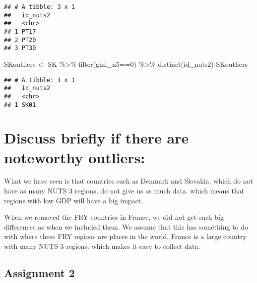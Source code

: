 \documentclass[
]{article}
\newenvironment{Shaded}{\begin{snugshade}}{\end{snugshade}}
\newcommand{\DecValTok}[1]{\textcolor[rgb]{0.00,0.00,0.81}{#1}}
\newcommand{\FunctionTok}[1]{\textcolor[rgb]{0.00,0.00,0.00}{#1}}
\newcommand{\NormalTok}[1]{#1}
\newcommand{\OtherTok}[1]{\textcolor[rgb]{0.56,0.35,0.01}{#1}}
\newcommand{\SpecialCharTok}[1]{\textcolor[rgb]{0.00,0.00,0.00}{#1}}
\begin{document}
\begin{verbatim}
## # A tibble: 3 x 1
##   id_nuts2
##   <chr>   
## 1 PT17    
## 2 PT20    
## 3 PT30
\end{verbatim}

\begin{Shaded}
\begin{Highlighting}[]
\NormalTok{SKoutliers }\OtherTok{\textless{}{-}}\NormalTok{ SK }\SpecialCharTok{\%\textgreater{}\%}
  \FunctionTok{filter}\NormalTok{(gini\_n5}\SpecialCharTok{==}\DecValTok{0}\NormalTok{) }\SpecialCharTok{\%\textgreater{}\%}
  \FunctionTok{distinct}\NormalTok{(id\_nuts2)}
\NormalTok{SKoutliers}
\end{Highlighting}
\end{Shaded}

\begin{verbatim}
## # A tibble: 1 x 1
##   id_nuts2
##   <chr>   
## 1 SK01
\end{verbatim}

\hypertarget{discuss-briefly-if-there-are-noteworthy-outliers}{%
\section{Discuss briefly if there are noteworthy
outliers:}\label{discuss-briefly-if-there-are-noteworthy-outliers}}

What we have seen is that countries such as Denmark and Slovakia, which
do not have as many NUTS 3 regions, do not give us as much data. which
means that regions with low GDP will have a big impact.

When we removed the FRY countries in France, we did not get such big
differences as when we included them. We assume that this has something
to do with where these FRY regions are places in the world. France is a
large country with many NUTS 3 regions. which makes it easy to collect
data.

\hypertarget{assignment-2}{%
\subsection{Assignment 2}\label{assignment-2}}
\end{document}
